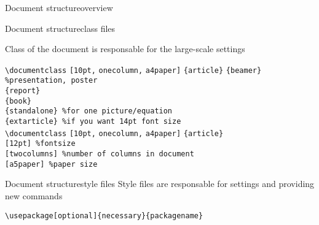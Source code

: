 \begin{frame}[fragile]{Document structure}{overview}
    
    
\end{frame}

\begin{frame}[fragile]{Document structure}{class files}

Class of the document is responsable for the large-scale settings
    \cprotect{} 
{
\scriptsize
\begin{tabbing}
\lstinline|\documentclass|\hspace{-1ex} \= \lstinline|[10pt,|  \= \lstinline|onecolumn,|  \=  \lstinline|a4paper]|\hspace{-1ex} \= \lstinline|{article}| \kill
\> \> \> \> \lstinline|{beamer} %presentation, poster| \\
\> \> \> \> \lstinline|{report}| \\
\> \> \> \> \lstinline|{book}| \\
\> \> \> \> \lstinline|{standalone} %for one picture/equation| \\
\> \> \> \> \lstinline|{extarticle} %if you want 14pt font size| \\
\lstinline|\documentclass| \> \lstinline|[10pt,|  \> \lstinline|onecolumn,|  \>  \lstinline|a4paper]| \> \lstinline|{article}| \\ 
\> \lstinline|[12pt] %fontsize| \> \\ 
\> \> \lstinline|[twocolumns] %number of columns in document| \> \\ 
\> \> \> \lstinline|[a5paper] %paper size| \> \\ 
\end{tabbing}}
\cprotect{}
\end{frame}

\begin{frame}[fragile]{Document structure}{style files}
     Style files are responsable for settings and providing new commands 
     
     \vfill
     \hspace{-1ex}
     \lstinline[basicstyle=\tt\large]|\usepackage[optional]{necessary}{packagename}|
     \vfill
\end{frame}


\cprotect{}